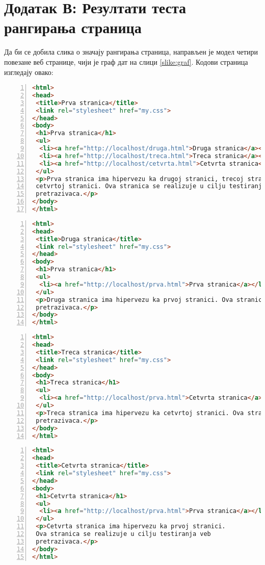 \appendix
\setcounter{secnumdepth}{0}
\section{Додатак В: Резултати теста рангирања страница}\label{sec:dodatakc}

Да би се добила слика о значају рангирања страница, направљен је модел четири повезане веб странице, чији је граф дат на слици \ref{slike:graf}. Кодови страница изгледају овако:

\begin{lstlisting}[language=HTML, caption=K\^{о}д прве странице, label={lst:prva}, numbers=left]
<html>
<head>
 <title>Prva stranica</title>
 <link rel="stylesheet" href="my.css">
</head>
<body>
 <h1>Prva stranica</h1>
 <ul>
  <li><a href="http://localhost/druga.html">Druga stranica</a></li>
  <li><a href="http://localhost/treca.html">Treca stranica</a></li>
  <li><a href="http://localhost/cetvrta.html">Cetvrta stranica</a></li>
 </ul>
 <p>Prva stranica ima hipervezu ka drugoj stranici, trecoj stranici,
 cetvrtoj stranici. Ova stranica se realizuje u cilju testiranja veb
 pretrazivaca.</p>
</body>
</html>
\end{lstlisting}%
\medskip

\begin{lstlisting}[language=HTML, caption=K\^{о}д друге странице, label={lst:druga}, numbers=left]
<html>
<head>
 <title>Druga stranica</title>
 <link rel="stylesheet" href="my.css">
</head>
<body>
 <h1>Prva stranica</h1>
 <ul>
  <li><a href="http://localhost/prva.html">Prva stranica</a></li>
 </ul>
 <p>Druga stranica ima hipervezu ka prvoj stranici. Ova stranica se realizuje u cilju testiranja veb
 pretrazivaca.</p>
</body>
</html>
\end{lstlisting}%

\begin{lstlisting}[language=HTML, caption=K\^{о}д треће странице, label={lst:treca}, numbers=left]
<html>
<head>
 <title>Treca stranica</title>
 <link rel="stylesheet" href="my.css">
</head>
<body>
 <h1>Treca stranica</h1>
 <ul>
  <li><a href="http://localhost/prva.html">Cetvrta stranica</a></li>
 </ul>
 <p>Treca stranica ima hipervezu ka cetvrtoj stranici. Ova stranica se realizuje u cilju testiranja veb
 pretrazivaca.</p>
</body>
</html>
\end{lstlisting}%

\begin{lstlisting}[language=HTML, caption=K\^{о}д четврте странице, label={lst:prva}, numbers=left]
<html>
<head>
 <title>Cetvrta stranica</title>
 <link rel="stylesheet" href="my.css">
</head>
<body>
 <h1>Cetvrta stranica</h1>
 <ul>
  <li><a href="http://localhost/prva.html">Prva stranica</a></li>
 </ul>
 <p>Cetvrta stranica ima hipervezu ka prvoj stranici.
 Ova stranica se realizuje u cilju testiranja veb
 pretrazivaca.</p>
</body>
</html>
\end{lstlisting}

